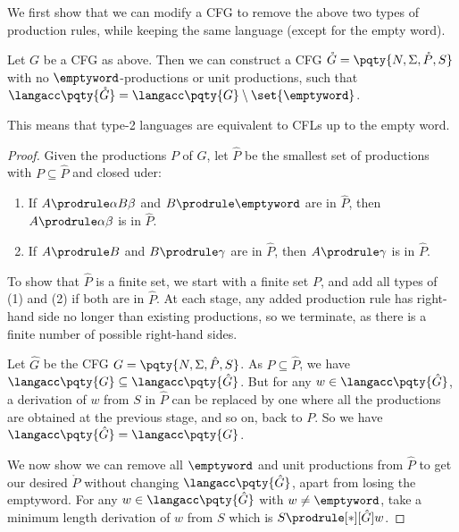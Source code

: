 We first show that we can modify a CFG to remove the above two types of production rules, while keeping the same language (except for the empty word).

\begin{theorem}
    \label{thm:remove-empty-unit}%
    Let \(G\) be a CFG as above. Then we can construct a CFG \(\mathring{G} = \pqty{N, \Sigma, \mathring{P}, S}\) with no \(\emptyword\)-productions or unit productions, such that \(\langacc\pqty{\mathring{G}} = \langacc\pqty{G} \setminus \set{\emptyword}\).
\end{theorem}

This means that type-2 languages are equivalent to CFLs up to the empty word.

\begin{proof}
    Given the productions \(P\) of \(G\), let \(\hat{P}\) be the smallest set of productions with \(P \subseteq \hat{P}\) and closed uder:
    \begin{enumerate}[label=(\arabic*)]
        \item If \(A \prodrule \alpha B \beta\) and \(B \prodrule \emptyword\) are in \(\hat{P}\), then \(A \prodrule \alpha \beta\) is in \(\hat{P}\).
        \item If \(A \prodrule B\) and \(B \prodrule \gamma\) are in \(\hat{P}\), then \(A \prodrule \gamma\) is in \(\hat{P}\).
    \end{enumerate}

    To show that \(\hat{P}\) is a finite set, we start with a finite set \(P\), and add all types of (1) and (2) if both are in \(\hat{P}\). At each stage, any added production rule has right-hand side no longer than existing productions, so we terminate, as there is a finite number of possible right-hand sides.

    Let \(\hat{G}\) be the CFG \(G = \pqty{N, \Sigma, \hat{P}, S}\). As \(P \subseteq \hat{P}\), we have \(\langacc\pqty{G} \subseteq \langacc\pqty{\hat{G}}\). But for any \(w \in \langacc\pqty{\hat{G}}\), a derivation of \(w\) from \(S\) in \(\hat{P}\) can be replaced by one where all the productions are obtained at the previous stage, and so on, back to \(P\). So we have \(\langacc\pqty{\hat{G}} = \langacc\pqty{G}\).

    We now show we can remove all \(\emptyword\) and unit productions from \(\hat{P}\) to get our desired \(\mathring{P}\) without changing \(\langacc\pqty{\hat{G}}\), apart from losing the emptyword. For any \(w \in \langacc\pqty{\hat{G}}\) with \(w \neq \emptyword\), take a minimum length derivation of \(w\) from \(S\) which is \(S \prodrule[\ast][\hat{G}] w\).
    

\end{proof}
